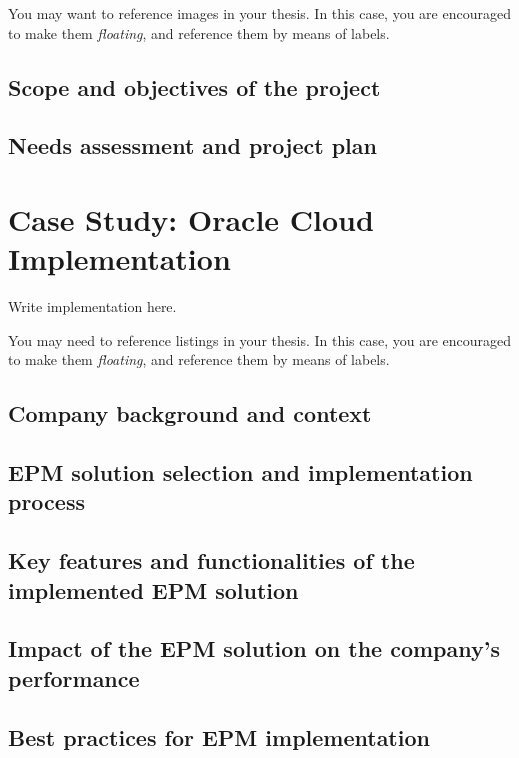 \documentclass[12pt,a4paper,openright,twoside]{book}
\begin{document}
You may want to reference images in your thesis.
%
In this case, you are encouraged to make them \emph{floating}, and reference them by means of labels.

\section{Scope and objectives of the project}

\section{Needs assessment and project plan}

\chapter{Case Study: Oracle Cloud Implementation}
\label{chap:implementation}

Write implementation here.

You may need to reference listings in your thesis.
%
In this case, you are encouraged to make them \emph{floating}, and reference them by means of labels.

\section{Company background and context}

\section{EPM solution selection and implementation process}

\section{Key features and functionalities of the implemented EPM solution}

\section{Impact of the EPM solution on the company's performance}

\section{Best practices for EPM implementation}
\end{document}
